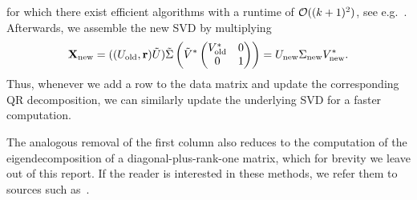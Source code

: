 for which there exist efficient algorithms with a runtime of $\mathcal{O}((k + 1)^2)$, see e.g.~\cite{Gu1995, JakovcevicStor2015, Jiang2023}. Afterwards, we assemble the new SVD by multiplying
\begin{equation*}
    \mathbf{X}_\text{new} = ((U_\text{old}, \mathbf{r}) \tilde{U}) \tilde{\Sigma} \left( \tilde{V}^* \begin{pmatrix}
        V_\text{old}^* & 0 \\
        0 & 1
     \end{pmatrix} \right) = U_\text{new} \Sigma_\text{new} V_\text{new}^*.
\end{equation*}
Thus, whenever we add a row to the data matrix and update the corresponding QR decomposition, we can similarly update the underlying SVD for a faster computation.

The analogous removal of the first column also reduces to the computation of the eigendecomposition of a diagonal-plus-rank-one matrix, which for brevity we leave out of this report. If the reader is interested in these methods, we refer them to sources such as~\cite{Jiang2023}.
